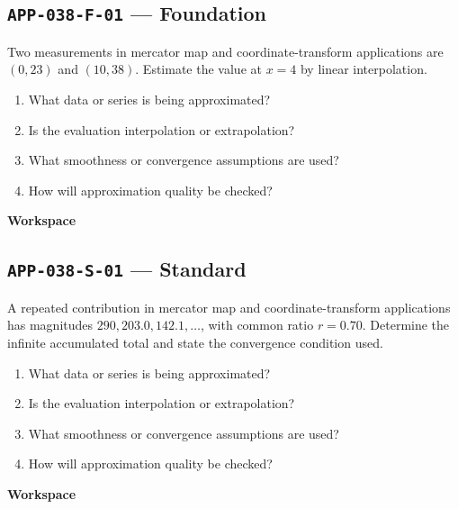 \documentclass[11pt]{book}
\newcommand{\pid}[1]{\texttt{#1}}
\newcommand{\workspace}{\par\vspace{0.7in}\hrulefill\par\vspace{0.55in}\hrulefill\par}
\begin{document}
\subsection*{\pid{APP-038-F-01} — Foundation}
\begin{problembox}
Two measurements in mercator map and coordinate-transform applications are $(0,23)$ and $(10,38)$. Estimate the value at $x=4$ by linear interpolation.
\end{problembox}
\begin{promptbox}\begin{enumerate}
\item What data or series is being approximated?
\item Is the evaluation interpolation or extrapolation?
\item What smoothness or convergence assumptions are used?
\item How will approximation quality be checked?
\end{enumerate}\end{promptbox}
\textbf{Workspace}\workspace
{}
\subsection*{\pid{APP-038-S-01} — Standard}
\begin{problembox}
A repeated contribution in mercator map and coordinate-transform applications has magnitudes $290, 203.0, 142.1,\ldots$, with common ratio $r=0.70$. Determine the infinite accumulated total and state the convergence condition used.
\end{problembox}
\begin{promptbox}\begin{enumerate}
\item What data or series is being approximated?
\item Is the evaluation interpolation or extrapolation?
\item What smoothness or convergence assumptions are used?
\item How will approximation quality be checked?
\end{enumerate}\end{promptbox}
\textbf{Workspace}\workspace
{}
\end{document}
